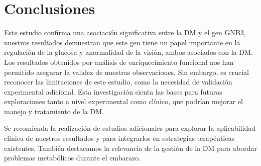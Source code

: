 \section{Conclusiones}

Este estudio confirma una asociación significativa entre la DM y el gen GNB3, nuestros resultados demuestran que este gen tiene un papel importante en la regulación de la glucosa y anormalidad de la visión, ambos asociados con la DM. Los resultados obtenidos por análisis de enriquecimiento funcional nos han permitido asegurar la validez de nuestras observaciones. Sin embargo, es crucial reconocer las limitaciones de este estudio, como la necesidad de validación experimental adicional.
Esta investigación sienta las bases para futuras exploraciones tanto a nivel experimental como clínico, que podrían mejorar el manejo y tratamiento de la DM.

Se recomienda la realización de estudios adicionales para explorar la aplicabilidad clínica de nuestros resultados y para integrarlos en estrategias terapéuticas existentes. También destacamos la relevancia de la gestión de la DM para abordar problemas metabólicos durante el embarazo. 

